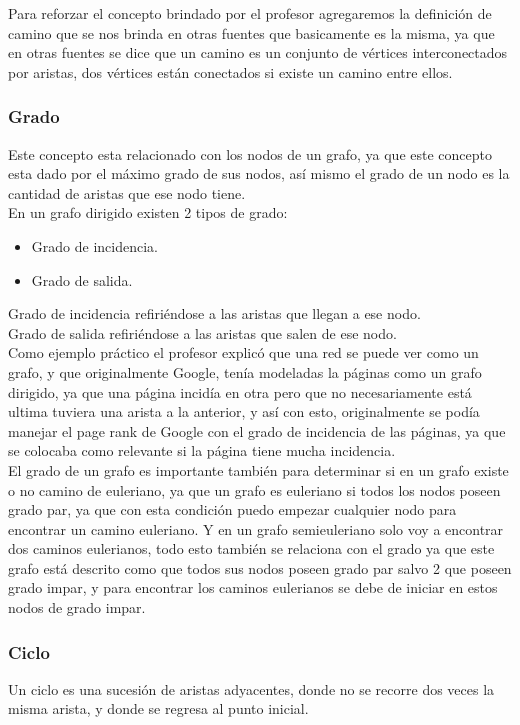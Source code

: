 \documentclass[10pt,a4paper]{article}
\begin{document}
	Para reforzar el concepto brindado por el profesor agregaremos la definición de camino que se nos brinda en otras fuentes que basicamente es la misma, ya que en otras fuentes se dice que un camino es un conjunto de vértices interconectados por aristas, dos vértices están conectados si existe un camino entre ellos.
\subsubsection{Grado}
	Este concepto esta relacionado con los nodos de un grafo, ya que este concepto esta dado por el máximo grado de sus nodos, así mismo el grado de un nodo es la cantidad de aristas que ese nodo tiene.\\
	En un grafo dirigido existen 2 tipos de grado:
\begin{itemize}
	\item Grado de incidencia.
	\item Grado de salida. 
\end{itemize}
Grado de incidencia refiriéndose a las aristas que llegan a ese nodo.\\ 
Grado de salida refiriéndose a las aristas que salen de ese nodo.\\
	
	Como ejemplo práctico el profesor explicó que una red se puede ver como un grafo, y que originalmente Google, tenía modeladas la páginas como un grafo dirigido, ya que una página incidía en otra pero que no necesariamente está ultima tuviera una arista a la anterior, y así con esto, originalmente se podía manejar el page rank de Google con el grado de incidencia de las páginas, ya que se colocaba como relevante si la página tiene mucha incidencia.\\  	 
	
	El grado de un grafo es importante también para determinar si en un grafo existe o no camino de euleriano, ya que un grafo es euleriano si todos los nodos poseen grado par, ya que con esta condición puedo empezar cualquier nodo para encontrar un camino euleriano. Y en un grafo semieuleriano solo voy a encontrar dos caminos eulerianos, todo esto también se relaciona con el grado ya que este grafo está descrito como que todos sus nodos poseen grado par salvo 2 que poseen grado impar, y para encontrar los caminos eulerianos se debe de iniciar en estos nodos de grado impar.\\
\subsubsection{Ciclo}
Un ciclo es una sucesión de aristas adyacentes, donde no se recorre dos veces la misma arista, y donde se regresa al punto inicial.\\
\cite{Grafos}
\end{document}
